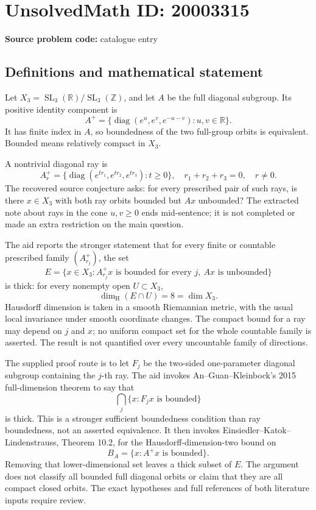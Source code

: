 \documentclass[11pt]{article}
\newcommand{\Z}{\mathbb{Z}}
\newcommand{\R}{\mathbb{R}}
\begin{document}
\section*{UnsolvedMath ID: 20003315}
\textbf{Source problem code:} catalogue entry
\subsection{Definitions and mathematical statement}
Let \(X_3=\operatorname{SL}_3(\R)/\operatorname{SL}_3(\Z)\), and let \(A\) be the full diagonal subgroup. Its positive identity component is
\[
 A^+=\{\operatorname{diag}(e^{u},e^{v},e^{-u-v}):u,v\in\R\}.
\]
It has finite index in \(A\), so boundedness of the two full-group orbits is equivalent. Bounded means relatively compact in \(X_3\).

A nontrivial diagonal ray is
\[
 A_r^+=\{\operatorname{diag}(e^{tr_1},e^{tr_2},e^{tr_3}):t\geq0\},
 \quad r_1+r_2+r_3=0,\quad r\ne0.
\]
The recovered source conjecture asks: for every prescribed pair of such rays, is there \(x\in X_3\) with both ray orbits bounded but \(Ax\) unbounded? The extracted note about rays in the cone \(u,v\geq0\) ends mid-sentence; it is not completed or made an extra restriction on the main question.

The aid reports the stronger statement that for every finite or countable prescribed family \((A_{r_j}^+)\), the set
\[
 E=\{x\in X_3:A_{r_j}^+x\text{ is bounded for every }j,\ Ax\text{ is unbounded}\}
\]
is thick: for every nonempty open \(U\subset X_3\),
\[
 \dim_{\mathrm H}(E\cap U)=8=\dim X_3.
\]
Hausdorff dimension is taken in a smooth Riemannian metric, with the usual local invariance under smooth coordinate changes. The compact bound for a ray may depend on \(j\) and \(x\); no uniform compact set for the whole countable family is asserted. The result is not quantified over every uncountable family of directions.

The supplied proof route is to let \(F_j\) be the two-sided one-parameter diagonal subgroup containing the \(j\)-th ray. The aid invokes An--Guan--Kleinbock's 2015 full-dimension theorem to say that
\[
 \bigcap_j\{x:F_jx\text{ is bounded}\}
\]
is thick. This is a stronger sufficient boundedness condition than ray boundedness, not an asserted equivalence. It then invokes Einsiedler--Katok--Lindenstrauss, Theorem 10.2, for the Hausdorff-dimension-two bound on
\[
 B_A=\{x:A^+x\text{ is bounded}\}.
\]
Removing that lower-dimensional set leaves a thick subset of \(E\). The argument does not classify all bounded full diagonal orbits or claim that they are all compact closed orbits. The exact hypotheses and full references of both literature inputs require review.
\end{document}
